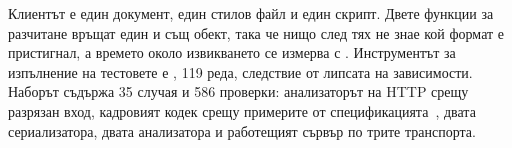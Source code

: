 Клиентът е един документ, един стилов файл и един скрипт. Двете функции за разчитане връщат
един и същ обект, така че нищо след тях не знае кой формат е пристигнал, а времето около
извикването се измерва с . Инструментът за изпълнение на тестовете е
, 119 реда, следствие от липсата на зависимости. Наборът съдържа 35 случая
и 586 проверки: анализаторът на HTTP срещу разрязан вход, кадровият кодек срещу примерите от
спецификацията~\cite{rfc6455}, двата сериализатора, двата анализатора и работещият сървър по
трите транспорта.

